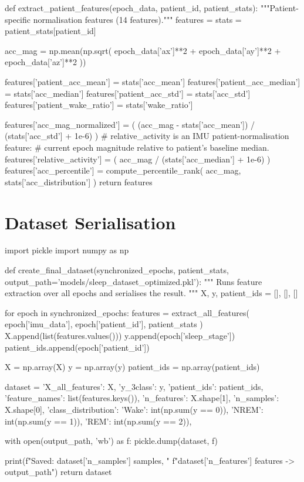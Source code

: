 \begin{pycode}
def extract_patient_features(epoch_data, patient_id, patient_stats):
    """Patient-specific normalisation features (14 features)."""
    features = {}
    stats = patient_stats[patient_id]

    acc_mag = np.mean(np.sqrt(
        epoch_data['ax']**2 +
        epoch_data['ay']**2 +
        epoch_data['az']**2
    ))

    features['patient_acc_mean']   = stats['acc_mean']
    features['patient_acc_median'] = stats['acc_median']
    features['patient_acc_std']    = stats['acc_std']
    features['patient_wake_ratio'] = stats['wake_ratio']

    features['acc_mag_normalized'] = (
        (acc_mag - stats['acc_mean']) / (stats['acc_std'] + 1e-6)
    )
    # relative_activity is an IMU patient-normalisation feature:
    # current epoch magnitude relative to patient's baseline median.
    features['relative_activity'] = (
        acc_mag / (stats['acc_median'] + 1e-6)
    )
    features['acc_percentile'] = compute_percentile_rank(
        acc_mag, stats['acc_distribution']
    )
    return features
\end{pycode}


\section{Dataset Serialisation}
\label{app:serialisation}

\begin{pycode}
import pickle
import numpy as np

def create_final_dataset(synchronized_epochs, patient_stats,
                          output_path='models/sleep_dataset_optimized.pkl'):
    """
    Runs feature extraction over all epochs and serialises the result.
    """
    X, y, patient_ids = [], [], []

    for epoch in synchronized_epochs:
        features = extract_all_features(
            epoch['imu_data'], epoch['patient_id'], patient_stats
        )
        X.append(list(features.values()))
        y.append(epoch['sleep_stage'])
        patient_ids.append(epoch['patient_id'])

    X           = np.array(X)
    y           = np.array(y)
    patient_ids = np.array(patient_ids)

    dataset = {
        'X_all_features': X,
        'y_3class':        y,
        'patient_ids':     patient_ids,
        'feature_names':   list(features.keys()),
        'n_features':      X.shape[1],
        'n_samples':       X.shape[0],
        'class_distribution': {
            'Wake': int(np.sum(y == 0)),
            'NREM': int(np.sum(y == 1)),
            'REM':  int(np.sum(y == 2)),
        }
    }

    with open(output_path, 'wb') as f:
        pickle.dump(dataset, f)

    print(f"Saved: {dataset['n_samples']} samples, "
          f"{dataset['n_features']} features -> {output_path}")
    return dataset
\end{pycode}


